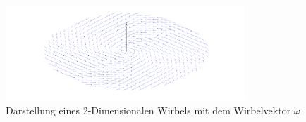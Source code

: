 \begin{figure}
\centering
\includegraphics[width=0.8\textwidth]{papers/wirbelringe/fig/flacher_wirbel.pdf}
\caption{Darstellung eines 2-Dimensionalen Wirbels mit dem Wirbelvektor \(\omega\) \label{buch:papers:Wirbelringe:fig:flacher_wirbel}}
\end{figure}